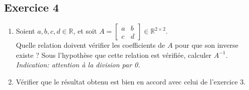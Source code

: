 \documentclass{article}
\newcommand{\R}{\mathbb{R}}
\newcommand{\cross}{\times}
\begin{document}
\subsection*{Exercice 4}
\begin{enumerate}
    \item Soient $a,b,c,d \in \R$, et soit $A = \begin{bmatrix} a & b \\ c & d \end{bmatrix} \in \R^{2 \cross 2}$. \\
    Quelle relation doivent vérifier les coefficients de $A$ pour que son inverse existe ? Sous l'hypothèse que cette relation est vérifiée, calculer $A^{-1}$.\\
    \textit{Indication: attention à la division par 0.}
    \item Vérifier que le résultat obtenu est bien en accord avec celui de l'exercice 3.
\end{enumerate} 
\end{document}

